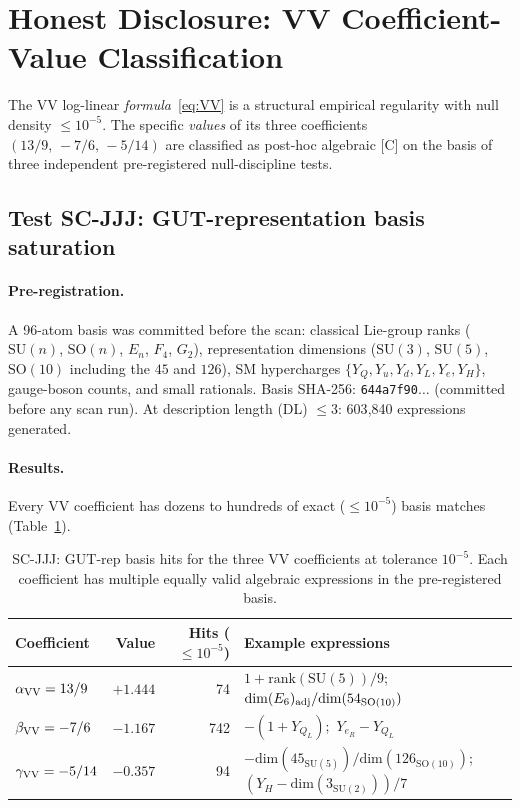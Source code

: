\documentclass[11pt]{article}
\theoremstyle{remark}
\begin{document}
\section{Honest Disclosure: VV Coefficient-Value Classification}
\label{sec:vv_honest}

The VV log-linear \emph{formula}~\eqref{eq:VV} is a structural empirical
regularity with null density $\leq10^{-5}$.
The specific \emph{values} of its three coefficients $(13/9,\,-7/6,\,-5/14)$
are classified as post-hoc algebraic [C] on the basis of three independent
pre-registered null-discipline tests.

\subsection{Test SC-JJJ: GUT-representation basis saturation}
\label{sec:jjj}

\paragraph{Pre-registration.}
A 96-atom basis was committed before the scan: classical Lie-group ranks
($\mathrm{SU}(n)$, $\mathrm{SO}(n)$, $E_n$, $F_4$, $G_2$),
representation dimensions ($\mathrm{SU}(3)$, $\mathrm{SU}(5)$, $\mathrm{SO}(10)$
including the $45$ and $126$), SM hypercharges
$\{Y_Q,Y_u,Y_d,Y_L,Y_e,Y_H\}$, gauge-boson counts, and small rationals.
Basis SHA-256: \texttt{644a7f90}$\ldots$ (committed before any scan run).
At description length (DL) $\leq3$: 603{,}840 expressions generated.

\paragraph{Results.}
Every VV coefficient has dozens to hundreds of exact ($\leq10^{-5}$)
basis matches (Table~\ref{tab:jjj}).

\begin{table}[ht]
\centering
\caption{SC-JJJ: GUT-rep basis hits for the three VV coefficients at tolerance $10^{-5}$.
Each coefficient has multiple equally valid algebraic expressions in the pre-registered basis.}
\label{tab:jjj}
\small
\begin{tabular}{lrrl}
\toprule
Coefficient & Value & Hits ($\leq10^{-5}$) & Example expressions \\
\midrule
$\alpha_{\rm VV}=13/9$ & $+1.444$ & 74 &
  $1+\mathrm{rank}(\mathrm{SU}(5))/9$;\
  $\mathrm{dim}(E_6)_{\rm adj}/\mathrm{dim}(54_{\mathrm{SO}(10)})$\\
$\beta_{\rm VV}=-7/6$ & $-1.167$ & 742 &
  $-(1+Y_{Q_L})$;\
  $Y_{e_R}-Y_{Q_L}$\\
$\gamma_{\rm VV}=-5/14$ & $-0.357$ & 94 &
  $-\mathrm{dim}(45_{\mathrm{SU}(5)})/\mathrm{dim}(126_{\mathrm{SO}(10)})$;\
  $(Y_H-\mathrm{dim}(3_{\mathrm{SU}(2)}))/7$\\
\bottomrule
\end{tabular}
\end{table}
\end{document}
